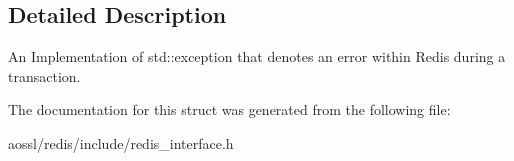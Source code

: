 \subsection{Detailed Description}
An Implementation of std\+::exception that denotes an error within Redis during a transaction. 

The documentation for this struct was generated from the following file\+:\begin{DoxyCompactItemize}
\item 
aossl/redis/include/redis\+\_\+interface.\+h\end{DoxyCompactItemize}
